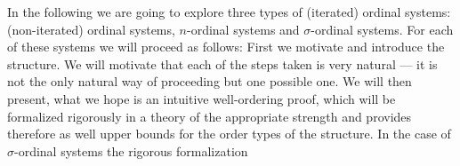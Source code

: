 \documentclass[10pt]{article}
\def\M{\mathrm{M}}
\def\I{\mathrm{I}}
\def\rec{\mathrm{rec}}
\begin{document}
In the following we are going to explore three types of (iterated)
ordinal systems: (non-iterated) ordinal systems,
$n$-ordinal systems and $\sigma$-ordinal systems.
For each of these systems we will proceed as follows: First we motivate
and introduce the structure. We will motivate that each of the steps
taken is very natural --- it is not the only natural
way of proceeding but one possible one.
We will then present, what we hope is an intuitive
well-ordering proof, which will be formalized rigorously in a 
theory of the appropriate strength and
provides therefore as well upper bounds for the order types of the structure.
In the case of $\sigma$-ordinal systems the rigorous formalization
\end{document}
